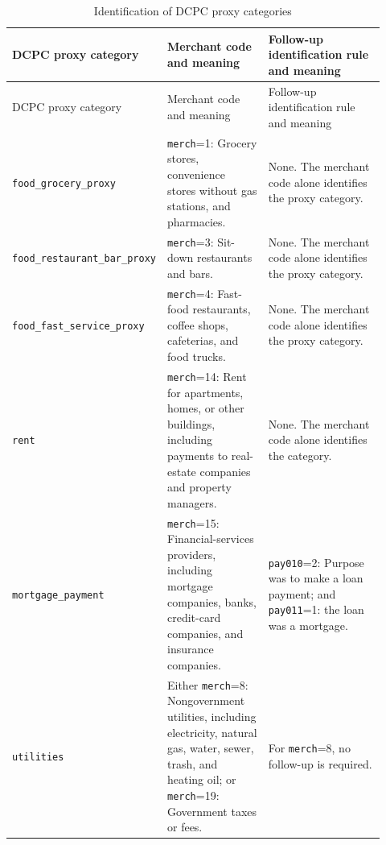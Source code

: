 \documentclass[11pt]{article}
\newcommand{\code}[1]{\nolinkurl{#1}}
\begin{document}
\clearpage

\begin{landscape}
	\footnotesize
	\setlength{\tabcolsep}{5pt}
	\renewcommand{\arraystretch}{1.25}
	
	\begin{longtable}{
			>{\RaggedRight\arraybackslash}p{0.20\linewidth}
			>{\RaggedRight\arraybackslash}p{0.31\linewidth}
			>{\RaggedRight\arraybackslash}p{0.41\linewidth}
		}
		\caption{Identification of DCPC proxy categories}
		\label{tab:dcpc-category-identification}\\
		
		\toprule
		DCPC proxy category &
		Merchant code and meaning &
		Follow-up identification rule and meaning \\
		\midrule
		\endfirsthead
		
		\toprule
		DCPC proxy category &
		Merchant code and meaning &
		Follow-up identification rule and meaning \\
		\midrule
		\endhead
		
		\bottomrule
		\endfoot
		
		\code{food_grocery_proxy} &
		\code{merch}=1: Grocery stores, convenience stores without gas stations,
		and pharmacies. &
		None. The merchant code alone identifies the proxy category. \\
		
		\code{food_restaurant_bar_proxy} &
		\code{merch}=3: Sit-down restaurants and bars. &
		None. The merchant code alone identifies the proxy category. \\
		
		\code{food_fast_service_proxy} &
		\code{merch}=4: Fast-food restaurants, coffee shops, cafeterias, and
		food trucks. &
		None. The merchant code alone identifies the proxy category. \\
		
		\code{rent} &
		\code{merch}=14: Rent for apartments, homes, or other buildings,
		including payments to real-estate companies and property managers. &
		None. The merchant code alone identifies the category. \\
		
		\code{mortgage_payment} &
		\code{merch}=15: Financial-services providers, including mortgage
		companies, banks, credit-card companies, and insurance companies. &
		\code{pay010}=2: Purpose was to make a loan payment; and
		\code{pay011}=1: the loan was a mortgage. \\
		
		\code{utilities} &
		Either \code{merch}=8: Nongovernment utilities, including electricity,
		natural gas, water, sewer, trash, and heating oil; or
		\code{merch}=19: Government taxes or fees. &
		For \code{merch}=8, no follow-up is required.
		

\end{longtable}
\end{landscape}
\end{document}
